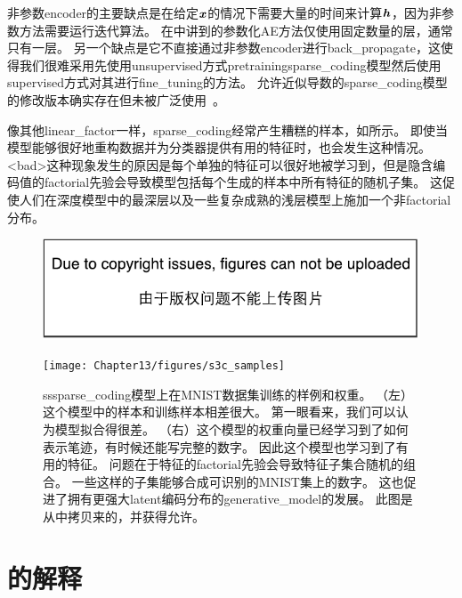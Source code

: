 非参数\gls{encoder}的主要缺点是在给定$\boldsymbol{\mathit{x}}$的情况下需要大量的时间来计算$\boldsymbol{\mathit{h}}$，因为非参数方法需要运行迭代算法。
在中讲到的参数化\gls{AE}方法仅使用固定数量的层，通常只有一层。
另一个缺点是它不直接通过非参数\gls{encoder}进行\gls{back_propagate}，这使得我们很难采用先使用\gls{unsupervised}方式\gls{pretraining}\gls{sparse_coding}模型然后使用\gls{supervised}方式对其进行\gls{fine_tuning}的方法。
允许近似导数的\gls{sparse_coding}模型的修改版本确实存在但未被广泛使用~\citep{Bradley+Bagnell-2009-small}。

像其他\gls{linear_factor}一样，\gls{sparse_coding}经常产生糟糕的样本，如所示。
即使当模型能够很好地重构数据并为分类器提供有用的特征时，也会发生这种情况。
<bad>这种现象发生的原因是每个单独的特征可以很好地被学习到，但是隐含编码值的\gls{factorial}先验会导致模型包括每个生成的样本中所有特征的随机子集。
这促使人们在深度模型中的最深层以及一些复杂成熟的浅层模型上施加一个非\gls{factorial}分布。

\begin{figure}[!htb]
\ifOpenSource
\centerline{\includegraphics{figure.pdf}}
\else
    \centerline{\texttt{[image: Chapter13/figures/s3c\_samples]}}
\fi
\caption{\gls{ss}\gls{sparse_coding}模型上在MNIST数据集训练的样例和权重。
（左）这个模型中的样本和训练样本相差很大。
第一眼看来，我们可以认为模型拟合得很差。
（右）这个模型的权重向量已经学习到了如何表示笔迹，有时候还能写完整的数字。
因此这个模型也学习到了有用的特征。
问题在于特征的\gls{factorial}先验会导致特征子集合随机的组合。
一些这样的子集能够合成可识别的MNIST集上的数字。
这也促进了拥有更强大\gls{latent}编码分布的\gls{generative_model}的发展。
此图是从\citet{Goodfeli-et-al-TPAMI-Deep-PrePrint-2013-small}中拷贝来的，并获得允许。}
\label{fig:s3c_samples}
\end{figure}



\section{的解释}
\label{sec:manifold_interpretation_of_pca}


